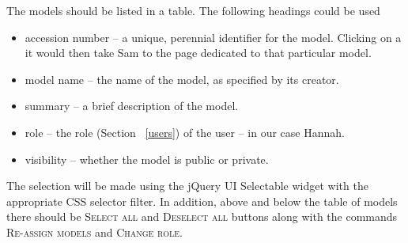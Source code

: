\begin{techNote}
The models should be listed in a table. The following headings could be used
\begin{itemize}
\item accession number -- a unique, perennial identifier for the model. Clicking on a it would then take Sam to the page dedicated to that particular model. 
\item model name -- the name of the model, as specified by its creator.
\item summary -- a brief description of the model.
\item role -- the role (Section ~\ref{users}) of the user -- in our case Hannah. 
\item visibility -- whether the model is public or private. 
\end{itemize}
The selection will be made  using the jQuery UI Selectable widget with the appropriate CSS selector filter. In addition, above and below the table of models there should be \textsc{Select all} and \textsc{Deselect all} buttons along with the commands \textsc{Re-assign models} and \textsc{Change role}.
\end{techNote}



